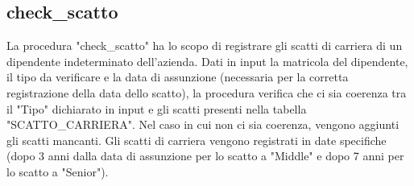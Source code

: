         \subsection{check\_scatto}
        La procedura "check\_scatto" ha lo scopo di registrare gli scatti di carriera di un dipendente indeterminato dell'azienda. Dati in input la  matricola del dipendente, il tipo da verificare e la data di assunzione (necessaria per la corretta registrazione della data dello scatto), la procedura verifica che ci sia coerenza tra il "Tipo" dichiarato in input e gli scatti presenti nella tabella "SCATTO\_CARRIERA". Nel caso in cui non ci sia coerenza, vengono aggiunti gli scatti mancanti. Gli scatti di carriera vengono registrati in date specifiche (dopo 3 anni dalla data di assunzione per lo scatto a "Middle" e dopo 7 anni per lo scatto a "Senior"). 
        \ttfamily
